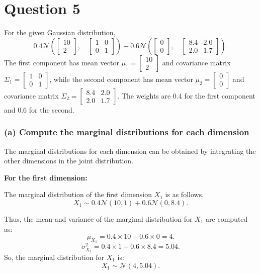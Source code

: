 \documentclass[12pt]{article}
\begin{document}
\section*{Question 5}
For the given Gaussian distribution,
\[
0.4\mathcal{N} \left( \begin{bmatrix} 10 \\ 2 \end{bmatrix}, \quad \begin{bmatrix} 1 & 0 \\ 0 & 1 \end{bmatrix} \right) + 0.6\mathcal{N} \left( \begin{bmatrix} 0 \\ 0 \end{bmatrix}, \quad \begin{bmatrix} 8.4 & 2.0 \\ 2.0 & 1.7 \end{bmatrix} \right).
\]
The first component has mean vector \( \mu_1 = \begin{bmatrix} 10 \\ 2 \end{bmatrix} \) and covariance matrix \( \Sigma_1 = \begin{bmatrix} 1 & 0 \\ 0 & 1 \end{bmatrix} \), while the second component has mean vector \( \mu_2 = \begin{bmatrix} 0 \\ 0 \end{bmatrix} \) and covariance matrix \( \Sigma_2 = \begin{bmatrix} 8.4 & 2.0 \\ 2.0 & 1.7 \end{bmatrix} \). The weights are 0.4 for the first component and 0.6 for the second.

\subsubsection*{(a) Compute the marginal distributions for each dimension}

The marginal distributions for each dimension can be obtained by integrating the other dimensions in the joint distribution.

\textbf{For the first dimension:}

The marginal distribution of the first dimension \( X_1 \) is as follows,
\[
X_1 \sim 0.4\mathcal{N}(10, 1) + 0.6\mathcal{N}(0, 8.4).
\]

Thus, the mean and variance of the marginal distribution for \( X_1 \) are computed as:
\[
\mu_{X_1} = 0.4 \times 10 + 0.6 \times 0 = 4.
\]
\[
\sigma^2_{X_1} = 0.4 \times 1 + 0.6 \times 8.4 = 5.04.
\]
So, the marginal distribution for \( X_1 \) is:
\[
X_1 \sim \mathcal{N}(4, 5.04).
\]
\end{document}
